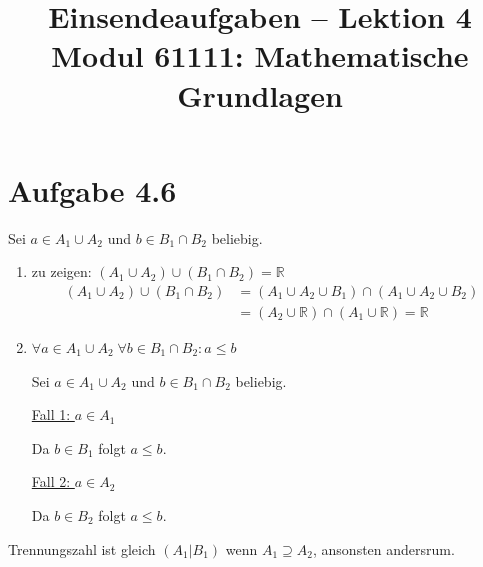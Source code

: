 \documentclass[a4paper,12pt]{article}
\title{Einsendeaufgaben -- Lektion 4\\[0.5em]
\large Modul 61111: Mathematische Grundlagen}
\author{}
\date{}
\begin{document}
\maketitle

\section*{Aufgabe 4.6}

Sei $a \in A_1 \cup A_2$ und $b \in B_1 \cap B_2$ beliebig.

\begin{enumerate}[label=\arabic*., start=2]

    \item zu zeigen: $(A_1 \cup A_2) \cup (B_1 \cap B_2) = \mathbb{R}$
    \begin{align*}
        (A_1 \cup A_2) \cup (B_1 \cap B_2)
        &= (A_1 \cup A_2 \cup B_1) \cap (A_1 \cup A_2 \cup B_2) \\
        &= (A_2 \cup \mathbb{R}) \cap (A_1 \cup \mathbb{R}) = \mathbb{R}
    \end{align*}

    \item $\forall a \in A_1 \cup A_2\; \forall b \in B_1 \cap B_2 : a \leq b$

    Sei $a \in A_1 \cup A_2$ und $b \in B_1 \cap B_2$ beliebig.

    \underline{Fall 1: $a \in A_1$}

    Da $b \in B_1$ folgt $a \leq b$.

    \underline{Fall 2: $a \in A_2$}

    Da $b \in B_2$ folgt $a \leq b$.

\end{enumerate}

Trennungszahl ist gleich $(A_1 | B_1)$ wenn $A_1 \supseteq A_2$, ansonsten andersrum.
\end{document}
